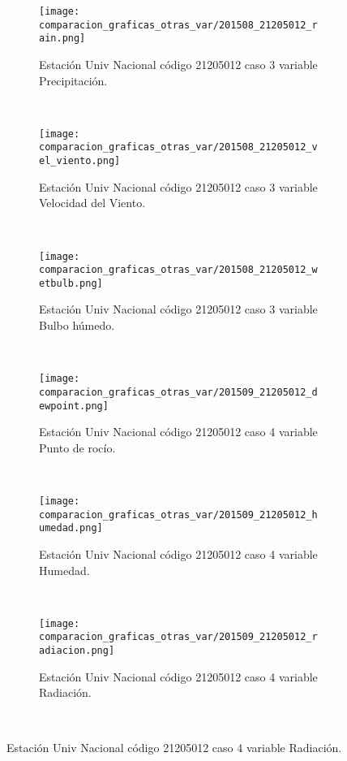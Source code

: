 \begin{figure}[H]
\centering
\begin{subfigure}[normla]{0.4\textwidth}
\caption{Estación Univ Nacional código 21205012 caso 3 variable Precipitación.}
\texttt{[image: comparacion\_graficas\_otras\_var/201508\_21205012\_rain.png]}
\end{subfigure}
~
\begin{subfigure}[normla]{0.4\textwidth}
\caption{Estación Univ Nacional código 21205012 caso 3 variable Velocidad del Viento.}
\texttt{[image: comparacion\_graficas\_otras\_var/201508\_21205012\_vel\_viento.png]}
\end{subfigure}
~
\begin{subfigure}[normla]{0.4\textwidth}
\caption{Estación Univ Nacional código 21205012 caso 3 variable Bulbo húmedo.}
\texttt{[image: comparacion\_graficas\_otras\_var/201508\_21205012\_wetbulb.png]}
\end{subfigure}
~
\begin{subfigure}[normla]{0.4\textwidth}
\caption{Estación Univ Nacional código 21205012 caso 4 variable Punto de rocío.}
\texttt{[image: comparacion\_graficas\_otras\_var/201509\_21205012\_dewpoint.png]}
\end{subfigure}
~
\begin{subfigure}[normla]{0.4\textwidth}
\caption{Estación Univ Nacional código 21205012 caso 4 variable Humedad.}
\texttt{[image: comparacion\_graficas\_otras\_var/201509\_21205012\_humedad.png]}
\end{subfigure}
~
\begin{subfigure}[normla]{0.4\textwidth}
\caption{Estación Univ Nacional código 21205012 caso 4 variable Radiación.}
\texttt{[image: comparacion\_graficas\_otras\_var/201509\_21205012\_radiacion.png]}
\end{subfigure}
~
\end{figure}
           
